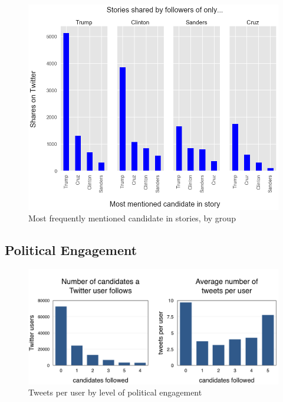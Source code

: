 \documentclass[letterpaper]{article}
\begin{document}

\begin{figure}[htbp!] 
\centering 
 \includegraphics[width=1.0\columnwidth]{who-shares-stories-about}  
  \caption{Most frequently mentioned candidate in stories, by group
    \label{fig:who-shares-stories-about}}
\end{figure}
 
\subsection{Political Engagement}


\begin{figure}[t!]  
\centering  
  \includegraphics[width=\columnwidth]{levels-of-engagement-charts}  
  \caption{Tweets per user by level of political engagement
    \label{fig:levels-of-engagement-charts}}
\end{figure}
\end{document}
